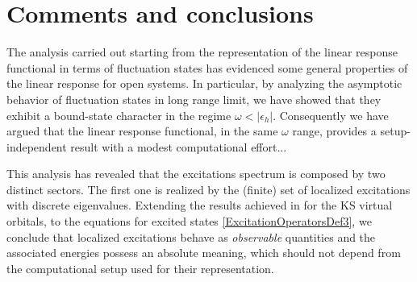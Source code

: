 \documentclass[reprint,aps,prb]{revtex4-1}
\newcommand{\eps}{\epsilon}
\begin{document}
% 
% 
% 


\section{Comments and conclusions}

The analysis carried out starting from the representation of the linear response functional in terms of fluctuation states has evidenced some general properties of the linear response
for open systems. In particular, by analyzing the asymptotic behavior of fluctuation states in long range limit, we have showed that they exhibit a bound-state character in the regime  
$\omega<|\eps_h|$. Consequently we have argued that the linear response functional, in the same $\omega$ range, provides a setup-independent result with a modest computational effort... 

This analysis has revealed that the excitations spectrum is composed by two distinct sectors. The first one is realized by the (finite) set of localized excitations with discrete eigenvalues. Extending 
the results achieved in \cite{boffi2016} for the KS virtual orbitals, to the equations for excited states \eqref{ExcitationOperatorsDef3}, we conclude that localized excitations behave as 
\emph{observable} quantities and the associated energies possess an absolute meaning, which should not depend from the computational setup used for their representation. 
\end{document}
